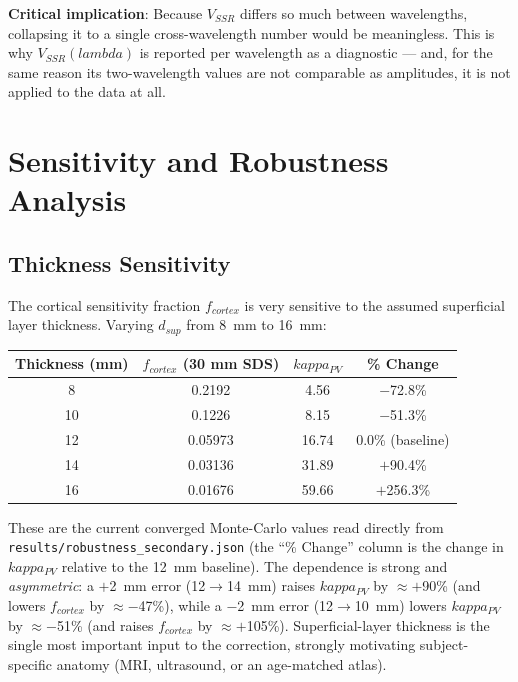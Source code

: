 \documentclass[12pt]{article}
\def\kappa{kappa}%
\def\lambda{lambda}%
\def\mathrm#1{#1}%
\def\text#1{#1}%
\begin{document}
\textbf{Critical implication}: Because $V_{\mathrm{SSR}}$ differs so much between wavelengths, collapsing it to a single cross-wavelength number would be meaningless. This is why $V_{\mathrm{SSR}}(\lambda)$ is reported per wavelength as a diagnostic --- and, for the same reason its two-wavelength values are not comparable as amplitudes, it is not applied to the data at all.

\section{Sensitivity and Robustness Analysis}

\subsection{Thickness Sensitivity}

The cortical sensitivity fraction $f_{\text{cortex}}$ is very sensitive to the assumed superficial layer thickness. Varying $d_{\text{sup}}$ from 8~mm to 16~mm:

\begin{center}
\begin{tabular}{cccc}
\hline
\textbf{Thickness (mm)} & $f_{\text{cortex}}$ (30 mm SDS) & $\kappa_{\text{PV}}$ & \% Change \\
\hline
8 & 0.2192 & 4.56 & $-$72.8\% \\
10 & 0.1226 & 8.15 & $-$51.3\% \\
12 & 0.05973 & 16.74 & 0.0\% (baseline) \\
14 & 0.03136 & 31.89 & $+$90.4\% \\
16 & 0.01676 & 59.66 & $+$256.3\% \\
\hline
\end{tabular}
\end{center}

These are the current converged Monte-Carlo values read directly from \texttt{results/\allowbreak robustness\_\allowbreak secondary.json} (the ``\% Change'' column is the change in $\kappa_{\text{PV}}$ relative to the 12~mm baseline). The dependence is strong and \emph{asymmetric}: a $+$2~mm error (12$\rightarrow$14~mm) raises $\kappa_{\text{PV}}$ by $\approx+$90\% (and lowers $f_{\text{cortex}}$ by $\approx-$47\%), while a $-$2~mm error (12$\rightarrow$10~mm) lowers $\kappa_{\text{PV}}$ by $\approx-$51\% (and raises $f_{\text{cortex}}$ by $\approx+$105\%). Superficial-layer thickness is the single most important input to the correction, strongly motivating subject-specific anatomy (MRI, ultrasound, or an age-matched atlas).
\end{document}
